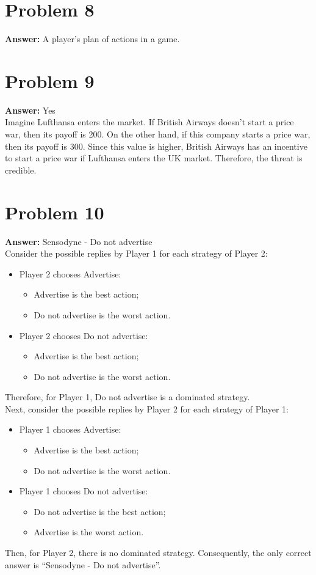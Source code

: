 \documentclass[11pt]{article}
\begin{document}
\section*{Problem 8}
\label{sec:orgda7b15c}

\textbf{Answer:} A player's plan of actions in a game.
\section*{Problem 9}
\label{sec:org52bea79}

\textbf{Answer:} Yes\\

Imagine Lufthansa enters the market. If British Airways doesn't start a price
war, then its payoff is 200. On the other hand, if this company starts a price
war, then its payoff is 300. Since this value is higher, British Airways has an
incentive to start a price war if Lufthansa enters the UK market. Therefore, the
threat is credible.
\section*{Problem 10}
\label{sec:orgc0bba98}

\textbf{Answer:} Sensodyne - Do not advertise\\

Consider the possible replies by Player 1 for each strategy of Player 2:
\begin{itemize}
\item Player 2 chooses Advertise:
\begin{itemize}
\item Advertise is the best action;
\item Do not advertise is the worst action.
\end{itemize}
\item Player 2 chooses Do not advertise:
\begin{itemize}
\item Advertise is the best action;
\item Do not advertise is the worst action.
\end{itemize}
\end{itemize}
Therefore, for Player 1, Do not advertise is a dominated strategy.\\
Next, consider the possible replies by Player 2 for each strategy of Player 1:
\begin{itemize}
\item Player 1 chooses Advertise:
\begin{itemize}
\item Advertise is the best action;
\item Do not advertise is the worst action.
\end{itemize}
\item Player 1 chooses Do not advertise:
\begin{itemize}
\item Do not advertise is the best action;
\item Advertise is the worst action.
\end{itemize}
\end{itemize}
Then, for Player 2, there is no dominated strategy. Consequently, the only
correct answer is ``Sensodyne - Do not advertise''.
\end{document}
